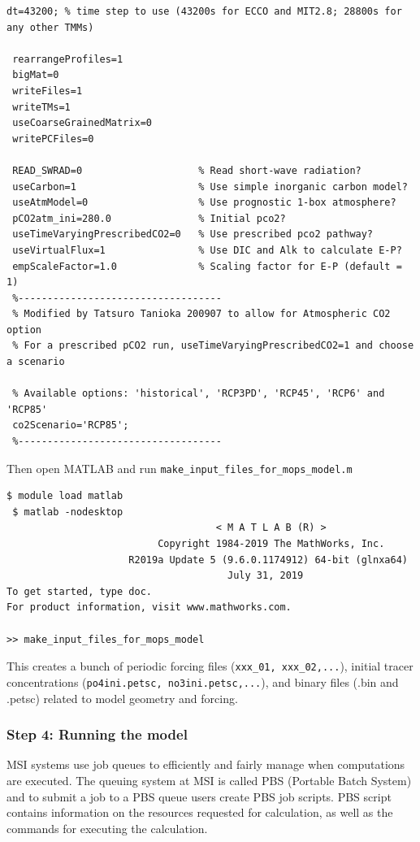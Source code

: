 \documentclass[a4paper]{article}
\def\noin{\noindent }
\begin{document}
\begin{enumerate}
\begin{lstlisting}[frame=single,basicstyle=\scriptsize,commentstyle=\color{blue}]
 dt=43200; % time step to use (43200s for ECCO and MIT2.8; 28800s for any other TMMs)
 
 rearrangeProfiles=1
 bigMat=0
 writeFiles=1
 writeTMs=1
 useCoarseGrainedMatrix=0
 writePCFiles=0
 
 READ_SWRAD=0                    % Read short-wave radiation?
 useCarbon=1                     % Use simple inorganic carbon model?
 useAtmModel=0                   % Use prognostic 1-box atmosphere?
 pCO2atm_ini=280.0               % Initial pco2?
 useTimeVaryingPrescribedCO2=0   % Use prescribed pco2 pathway?
 useVirtualFlux=1                % Use DIC and Alk to calculate E-P?
 empScaleFactor=1.0              % Scaling factor for E-P (default = 1)
 %-----------------------------------
 % Modified by Tatsuro Tanioka 200907 to allow for Atmospheric CO2 option
 % For a prescribed pCO2 run, useTimeVaryingPrescribedCO2=1 and choose a scenario
 
 % Available options: 'historical', 'RCP3PD', 'RCP45', 'RCP6' and 'RCP85'
 co2Scenario='RCP85';
 %-----------------------------------
\end{lstlisting}
\noin Then open MATLAB and run \verb/make_input_files_for_mops_model.m/
\begin{lstlisting}[style=DOS]
 $ module load matlab
 $ matlab -nodesktop
                                    < M A T L A B (R) >
                          Copyright 1984-2019 The MathWorks, Inc.
                     R2019a Update 5 (9.6.0.1174912) 64-bit (glnxa64)
                                      July 31, 2019
To get started, type doc.
For product information, visit www.mathworks.com.

>> make_input_files_for_mops_model
\end{lstlisting}
\noin This creates a bunch of periodic forcing files (\verb|xxx_01, xxx_02,...|), initial tracer concentrations (\verb|po4ini.petsc, no3ini.petsc,...|), and binary files (.bin and .petsc) related to model geometry and forcing.
\end{enumerate}

\subsubsection{Step 4: Running the model}
\noin MSI systems use job queues to efficiently and fairly manage when computations are executed. The queuing system at MSI is called PBS (Portable Batch System) and to submit a job to a PBS queue users create PBS job scripts. PBS script contains information on the resources requested for calculation, as well as the commands for executing the calculation. 
\end{document}
